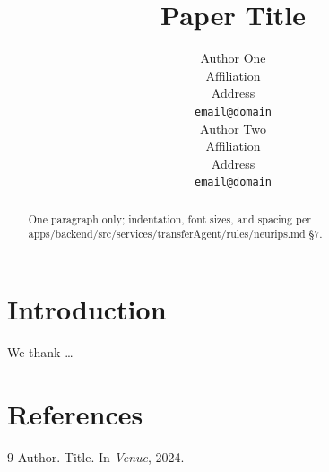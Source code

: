 \documentclass{article}
\title{Paper Title}
\author{%
  Author One \\
  Affiliation \\
  Address \\
  \texttt{email@domain} \\
  \And
  Author Two \\
  Affiliation \\
  Address \\
  \texttt{email@domain} \\
}
\begin{document}
\maketitle

\begin{abstract}
  One paragraph only; indentation, font sizes, and spacing per apps/backend/src/services/transferAgent/rules/neurips.md \S7.
\end{abstract}

\section{Introduction}


\clearpage

\begin{ack}
We thank \ldots
\end{ack}

\section*{References}
{
\small
\begin{thebibliography}{9}
  Author.
  \newblock Title.
  \newblock In \emph{Venue}, 2024.
\end{thebibliography}
}

\newpage

\end{document}
